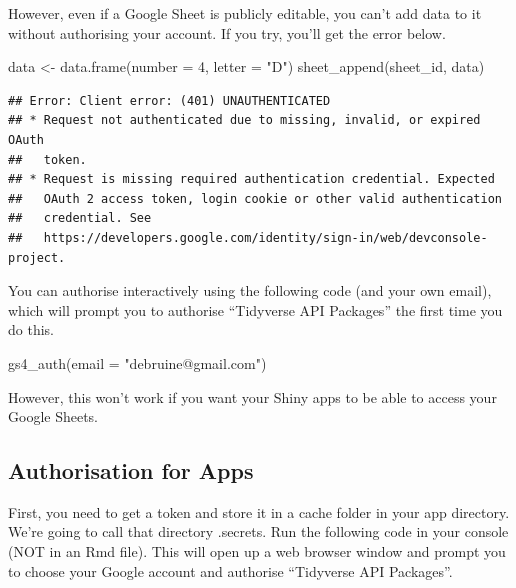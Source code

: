 \documentclass[
]{book}
\newenvironment{Shaded}{\begin{snugshade}}{\end{snugshade}}
\newcommand{\AttributeTok}[1]{\textcolor[rgb]{0.77,0.63,0.00}{#1}}
\newcommand{\DecValTok}[1]{\textcolor[rgb]{0.00,0.00,0.81}{#1}}
\newcommand{\FunctionTok}[1]{\textcolor[rgb]{0.00,0.00,0.00}{#1}}
\newcommand{\NormalTok}[1]{#1}
\newcommand{\OtherTok}[1]{\textcolor[rgb]{0.56,0.35,0.01}{#1}}
\newcommand{\StringTok}[1]{\textcolor[rgb]{0.31,0.60,0.02}{#1}}
\begin{document}
However, even if a Google Sheet is publicly editable, you can't add data to it without authorising your account. If you try, you'll get the error below.

\begin{Shaded}
\begin{Highlighting}[]
\NormalTok{data }\OtherTok{\textless{}{-}} \FunctionTok{data.frame}\NormalTok{(}\AttributeTok{number =} \DecValTok{4}\NormalTok{, }\AttributeTok{letter =} \StringTok{"D"}\NormalTok{)}
\FunctionTok{sheet\_append}\NormalTok{(sheet\_id, data)}
\end{Highlighting}
\end{Shaded}

\begin{verbatim}
## Error: Client error: (401) UNAUTHENTICATED
## * Request not authenticated due to missing, invalid, or expired OAuth
##   token.
## * Request is missing required authentication credential. Expected
##   OAuth 2 access token, login cookie or other valid authentication
##   credential. See
##   https://developers.google.com/identity/sign-in/web/devconsole-project.
\end{verbatim}

You can authorise interactively using the following code (and your own email), which will prompt you to authorise ``Tidyverse API Packages'' the first time you do this.

\begin{Shaded}
\begin{Highlighting}[]
\FunctionTok{gs4\_auth}\NormalTok{(}\AttributeTok{email =} \StringTok{"debruine@gmail.com"}\NormalTok{)}
\end{Highlighting}
\end{Shaded}

However, this won't work if you want your Shiny apps to be able to access your Google Sheets.

\hypertarget{authorisation-for-apps}{%
\subsection{Authorisation for Apps}\label{authorisation-for-apps}}

First, you need to get a token and store it in a cache folder in your app directory. We're going to call that directory .secrets. Run the following code in your console (NOT in an Rmd file). This will open up a web browser window and prompt you to choose your Google account and authorise ``Tidyverse API Packages''.
\end{document}
